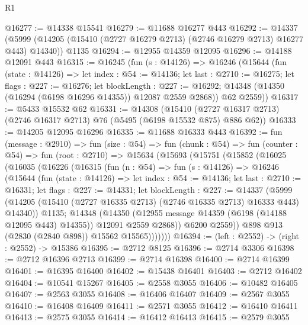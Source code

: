 \begin{lexlean}{R1}
\begin{coremodule}
@16277 := @14338 @15541
@16279 := @11688 @16277 @443
@16292 := @14337
    (@5999 (@14205 (@15410 (@2727 @16279 @2713) (@2746 @16279 @2713) @16277 @443) @14340))
    @1135
@16294 := @12955 @14359 @12095
@16296 := @14188 @12091 @443
@16315 := @16245
    (fun (s : @14126) =>
    @16246
      (@15644
        (fun (state : @14126) =>
        let index : @54 := @14136;
        let last : @2710 := @16275;
        let flags : @227 := @16276;
        let blockLength : @227 := @16292;
        @14348 (@14350 (@16294 (@6198 @16296 @14355)) @12087 @2559 @2868))
        @62
        @2559))
@16317 := @5433 @15532 @62
@16331 := @14308
    (@15410 (@2727 @16317 @2713) (@2746 @16317 @2713) @76 (@5495 (@6198 @15532 @875) @886 @62))
@16333 := @14205 @12095 @16296
@16335 := @11688 @16333 @443
@16392 := fun (message : @2910) =>
  fun (size : @54) =>
  fun (chunk : @54) =>
  fun (counter : @54) =>
  fun (root : @2710) =>
  @15634
    (@15693
      (@15751
        (@15852
          (@16025
            (@16035
              (@16226
                (@16315
                  (fun (n : @54) =>
                  fun (s : @14126) =>
                  @16246
                    (@15644
                      (fun (state : @14126) =>
                      let index : @54 := @14136;
                      let last : @2710 := @16331;
                      let flags : @227 := @14331;
                      let blockLength : @227 := @14337
                        (@5999
                          (@14205
                            (@15410 (@2727 @16335 @2713) (@2746 @16335 @2713) @16333 @443)
                            @14340))
                        @1135;
                      @14348
                        (@14350
                          (@12955 message @14359 (@6198 (@14188 @12095 @443) @14355))
                          @12091
                          @2559
                          @2868))
                      @6200
                      @2559))
                  @898
                  @913
                  (@2830 (@2840 @898))
                  @15562
                  @15565)))))))
@16394 := (left : @2552) -> (right : @2552) -> @15386
@16395 := @2712 @8125
@16396 := @2714 @3306
@16398 := @2712 @16396 @2713
@16399 := @2714 @16398
@16400 := @2714 @16399
@16401 := @16395 @16400
@16402 := @15438 @16401
@16403 := @2712 @16402
@16404 := @10541 @15267
@16405 := @2558 @3055
@16406 := @10482 @16405
@16407 := @2563 @3055
@16408 := @16406 @16407
@16409 := @2567 @3055
@16410 := @16408 @16409
@16411 := @2571 @3055
@16412 := @16410 @16411
@16413 := @2575 @3055
@16414 := @16412 @16413
@16415 := @2579 @3055

\end{coremodule}
\end{lexlean}
